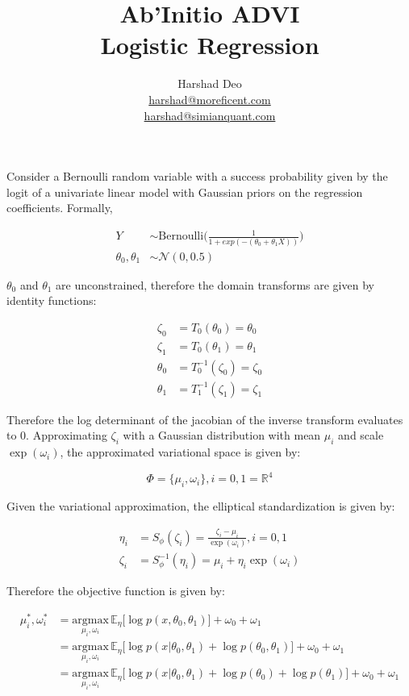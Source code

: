 \documentclass[10pt]{article}
\title{Ab'Initio ADVI \\ Logistic Regression}
\author{Harshad Deo \\ 
  \href{mailto:harshad@moreficent.com}{harshad@moreficent.com} \\ 
  \href{mailto:harshad@simianquant.com}{harshad@simianquant.com}
}
\date{}
\begin{document}
  
\maketitle

Consider a Bernoulli random variable with a success probability given by the logit of a univariate linear model with 
Gaussian priors on the regression coefficients. Formally,

\begin{align*}
  Y &\sim \text{Bernoulli}\Big(\frac{1}{1 + exp(-(\theta_0 + \theta_1 X))}\Big) \\
  \theta_0, \theta_1 &\sim \mathcal{N}(0, 0.5)
\end{align*}

$\theta_0$ and $\theta_1$ are unconstrained, therefore the domain transforms are given by identity functions:

\begin{align*}
  \zeta_0 &= T_0(\theta_0) = \theta_0 \\
  \zeta_1 &= T_0(\theta_1) = \theta_1 \\
  \theta_0 &= T^{-1}_0(\zeta_0) = \zeta_0 \\
  \theta_1 &= T^{-1}_1(\zeta_1) = \zeta_1
\end{align*}

Therefore the log determinant of the jacobian of the inverse transform evaluates to 0. Approximating $\zeta_i$ with a 
Gaussian distribution with mean $\mu_i$ and scale $\exp(\omega_i)$, the approximated variational space is given by:

\begin{equation*}
  \Phi = \{\mu_i, \omega_i\}, i = 0, 1 = \mathbb{R}^4
\end{equation*}


Given the variational approximation, the elliptical standardization is given by:

\begin{align*}
  \eta_i &= S_{\phi}(\zeta_i) = \frac{\zeta_i - \mu_i}{\exp(\omega_i)}, i = 0, 1 \\
  \zeta_i &= S_{\phi}^{-1}(\eta_i) = \mu_i + \eta_i \exp(\omega_i)
\end{align*}


Therefore the objective function is given by:

\begin{align*}
  \mu_i^*, \omega_i^* &= \underset{\mu_i, \omega_i}{\text{argmax}}\,\mathbb{E}_\eta\big[\log p(x, \theta_0, \theta_1) \big] + \omega_0 + \omega_1 \\
  &= \underset{\mu_i, \omega_i}{\text{argmax}}\,\mathbb{E}_\eta\big[\log p(x | \theta_0, \theta_1) + \log p(\theta_0, \theta_1) \big] + \omega_0 + \omega_1 \\
  &= \underset{\mu_i, \omega_i}{\text{argmax}}\,\mathbb{E}_\eta\big[\log p(x | \theta_0, \theta_1) + \log p(\theta_0) + \log p (\theta_1) \big] + \omega_0 + \omega_1
\end{align*}
\end{document}
